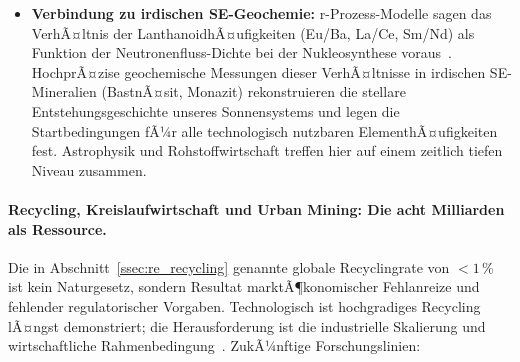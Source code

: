 ﻿\documentclass[12pt, a4paper]{report}
\theoremstyle{definition}
\theoremstyle{remark}
\begin{document}
\begin{itemize}
  \item \textbf{Verbindung zu irdischen SE-Geochemie:}
    r-Prozess-Modelle sagen das VerhÃ¤ltnis der LanthanoidhÃ¤ufigkeiten
    (Eu/Ba, La/Ce, Sm/Nd) als Funktion der Neutronenfluss-Dichte bei der
    Nukleosynthese voraus~\cite{thielemann2017}. HochprÃ¤zise geochemische
    Messungen dieser VerhÃ¤ltnisse in irdischen SE-Mineralien
    (BastnÃ¤sit, Monazit) rekonstruieren die stellare Entstehungsgeschichte
    unseres Sonnensystems und legen die Startbedingungen fÃ¼r alle technologisch
    nutzbaren ElementhÃ¤ufigkeiten fest. Astrophysik und Rohstoffwirtschaft
    treffen hier auf einem zeitlich tiefen Niveau zusammen.
\end{itemize}

\paragraph{Recycling, Kreislaufwirtschaft und Urban Mining: Die acht
Milliarden als Ressource.}
Die in Abschnitt~\ref{ssec:re_recycling} genannte globale Recyclingrate von
$< 1\,\%$~\cite{weng2015} ist kein Naturgesetz, sondern Resultat marktÃ¶konomischer
Fehlanreize und fehlender regulatorischer Vorgaben. Technologisch ist
hochgradiges Recycling lÃ¤ngst demonstriert; die Herausforderung ist die
industrielle Skalierung und wirtschaftliche Rahmenbedingung~\cite{binnemans2013}.
ZukÃ¼nftige Forschungslinien:
\end{document}
